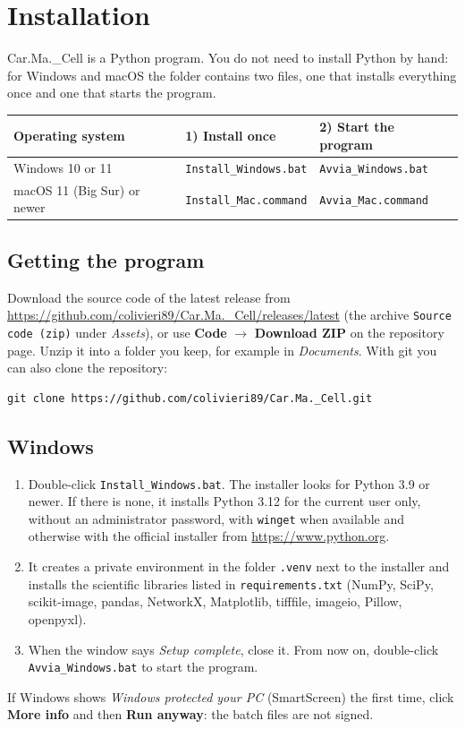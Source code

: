 \documentclass[fontsize=10.5pt,paper=a4,parskip=half,headings=normal,numbers=noenddot,
  open=any,captions=tableheading]{scrreprt}
\newcommand{\prog}{Car.Ma.\_Cell}
\newcommand{\btn}[1]{\textsf{\textbf{#1}}}
\newcommand{\file}[1]{\texttt{#1}}
\begin{document}
\chapter{Installation}\label{ch:install}

\prog{} is a Python program. You do not need to install Python by hand: for Windows and macOS the folder contains two files, one that installs everything once and one that starts the program.

\begin{center}\small
\begin{tabular}{@{}lll@{}}
\toprule
Operating system & 1) Install once & 2) Start the program \\
\midrule
Windows 10 or 11 & \file{Install\_Windows.bat} & \file{Avvia\_Windows.bat} \\
macOS 11 (Big Sur) or newer & \file{Install\_Mac.command} & \file{Avvia\_Mac.command} \\
\bottomrule
\end{tabular}
\end{center}

\section{Getting the program}

Download the source code of the latest release from \url{https://github.com/colivieri89/Car.Ma._Cell/releases/latest} (the archive \file{Source code (zip)} under \emph{Assets}), or use \btn{Code} $\rightarrow$ \btn{Download ZIP} on the repository page. Unzip it into a folder you keep, for example in \emph{Documents}. With git you can also clone the repository:
\begin{verbatim}
git clone https://github.com/colivieri89/Car.Ma._Cell.git
\end{verbatim}

\section{Windows}

\begin{enumerate}
\item Double-click \file{Install\_Windows.bat}. The installer looks for Python 3.9 or newer. If there is none, it installs Python 3.12 for the current user only, without an administrator password, with \texttt{winget} when available and otherwise with the official installer from \url{https://www.python.org}.
\item It creates a private environment in the folder \file{.venv} next to the installer and installs the scientific libraries listed in \file{requirements.txt} (NumPy, SciPy, scikit-image, pandas, NetworkX, Matplotlib, tifffile, imageio, Pillow, openpyxl).
\item When the window says \emph{Setup complete}, close it. From now on, double-click \file{Avvia\_Windows.bat} to start the program.
\end{enumerate}
If Windows shows \emph{Windows protected your PC} (SmartScreen) the first time, click \btn{More info} and then \btn{Run anyway}: the batch files are not signed.
\end{document}
